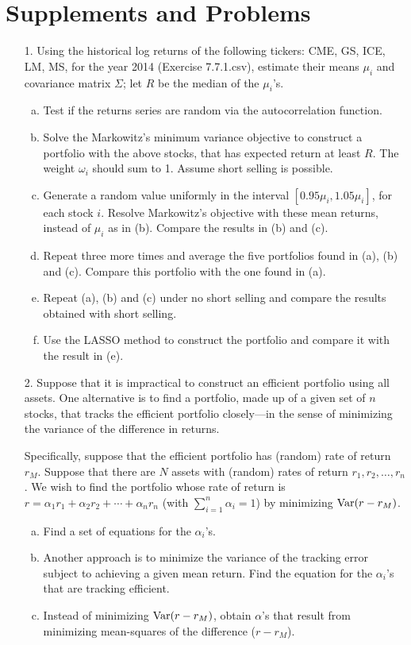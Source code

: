 \section{Supplements and Problems} 

\begin{enumerate}

\item[1.] Using the historical log returns of the following tickers: CME, GS, ICE, LM, MS, for the year 2014 (Exercise 7.7.1.csv), estimate their means $\mu_i$ and covariance matrix $\Sigma$; let $R$ be the median of the $\mu_i$'s. 
	\begin{enumerate}[(a)]
	\item Test if the returns series are random via the autocorrelation function.
	\item Solve the Markowitz's minimum variance objective to construct a portfolio with the above stocks, that has expected return at least $R$. The weight $\omega_i$ should sum to 1. Assume short selling is possible.
	\item Generate a random value uniformly in the interval $[0.95\mu_i,1.05\mu_i]$, for each stock $i$. Resolve Markowitz's objective with these mean returns, instead of $\mu_i$ as in (b). Compare the results in (b) and (c).
	\item Repeat three more times and average the five portfolios found in (a), (b) and (c). Compare this portfolio with the one found in (a).
	\item Repeat (a), (b) and (c) under no short selling and compare the results obtained with short selling.
	\item Use the LASSO method to construct the portfolio and compare it with the result in (e).
	\end{enumerate}
	
\item[2.] Suppose that it is impractical to construct an efficient portfolio using all assets. One alternative is to find a portfolio, made up of a given set of $n$ stocks, that tracks the efficient portfolio closely---in the sense of minimizing the variance of the difference in returns.


Specifically, suppose that the efficient portfolio has (random) rate of return $r_M$. Suppose that there are $N$ assets with (random) rates of return $r_1,r_2,\ldots,r_n$. We wish to find the portfolio whose rate of return is $r=\alpha_1 r_1+ \alpha_2 r_2+ \cdots+ \alpha_n r_n$ (with $\sum_{i=1}^n \alpha_i=1$) by minimizing $\operatorname{Var}(r - r_M)$.
	\begin{enumerate}[(a)]
	\item Find a set of equations for the $\alpha_i$'s.
	\item Another approach is to minimize the variance of the tracking error subject to achieving a given mean return. Find the equation for the $\alpha_i$'s that are tracking efficient.
	\item Instead of minimizing $\operatorname{Var}(r-r_M)$, obtain $\alpha$'s that result from minimizing mean-squares of the difference ($r-r_M$).
	\end{enumerate}




\end{enumerate}
